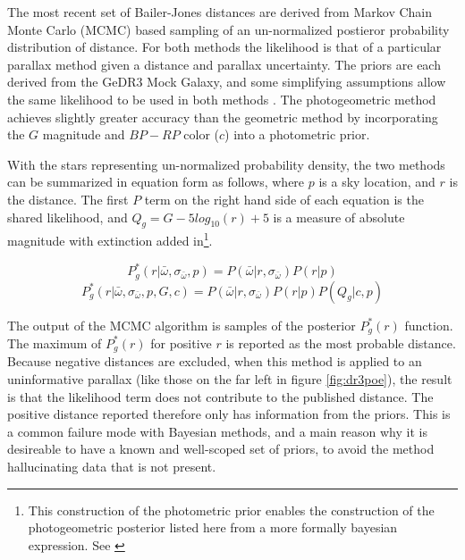 \documentclass[twocolumn]{aastex631}
\begin{document}
The most recent set of Bailer-Jones distances are derived from Markov Chain Monte Carlo (MCMC) based sampling of an un-normalized postieror probability distribution of distance. For both methods the likelihood is that of a particular parallax method given a distance and parallax uncertainty. The priors are each derived from the GeDR3 Mock Galaxy, and some simplifying assumptions allow the same likelihood to be used in both methods \citep{bailer-jonesEstimating2021}. The photogeometric method achieves slightly greater accuracy than the geometric method by incorporating the $G$ magnitude and $BP-RP$ color ($c$) into a photometric prior.

With the stars representing un-normalized probability density, the two methods can be summarized in equation form as follows, where $p$ is a sky location, and $r$ is the distance. The first $P$ term on the right hand side of each equation is the shared likelihood, and $Q_g = G - 5 log_{10}(r) + 5$ is a measure of absolute magnitude with extinction added in\footnote{This construction of the photometric prior enables the construction of the photogeometric posterior listed here from a more formally bayesian expression. See \cite{bailer-jonesEstimating2021} }.

$$ P_g^* (r| \bar{\omega}, \sigma_{\bar{\omega}}, p) = P(\bar{\omega} | r, \sigma_{\bar{\omega}}) P (r | p)$$
$$ P_g^* (r| \bar{\omega}, \sigma_{\bar{\omega}}, p, G, c) = P(\bar{\omega} | r, \sigma_{\bar{\omega}}) P (r | p) P(Q_g| c, p)$$

The output of the MCMC algorithm is samples of the posterior $P_g^*(r)$ function. The maximum of $P_g^*(r)$ for positive $r$ is reported as the most probable distance. Because negative distances are excluded, when this method is applied to an uninformative parallax (like those on the far left in figure \ref{fig:dr3poe}), the result is that the likelihood term does not contribute to the published distance. The positive distance reported therefore only has information from the priors. This is a common failure mode with Bayesian methods, and a main reason why it is desireable to have a known and well-scoped set of priors, to avoid the method hallucinating data that is not present.
\end{document}
